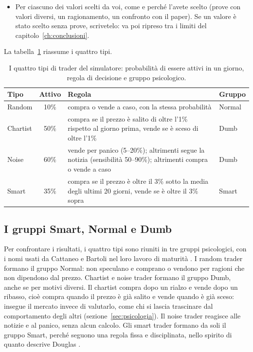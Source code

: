 \begin{aggiunte}
\begin{itemize}
  \item Per ciascuno dei valori scelti da voi, come e perché l'avete scelto
        (prove con valori diversi, un ragionamento, un confronto con il
        paper). Se un valore è stato scelto senza prove, scrivetelo: va poi
        ripreso tra i limiti del capitolo~\ref{ch:conclusioni}.
\end{itemize}
\end{aggiunte}

La tabella~\ref{tab:trader} riassume i quattro tipi.

\begin{table}[htbp]
\centering
\small
\begin{tabular}{@{}lcp{6.2cm}l@{}}
\toprule
Tipo & Attivo & Regola & Gruppo \\
\midrule
Random   & 10\% & compra o vende a caso, con la stessa probabilità & Normal \\
Chartist & 50\% & compra se il prezzo è salito di oltre l'1\% rispetto al giorno prima, vende se è sceso di oltre l'1\% & Dumb \\
Noise    & 60\% & vende per panico (5--20\%); altrimenti segue la notizia (sensibilità 50--90\%); altrimenti compra o vende a caso & Dumb \\
Smart    & 35\% & compra se il prezzo è oltre il 3\% sotto la media degli ultimi 20 giorni, vende se è oltre il 3\% sopra & Smart \\
\bottomrule
\end{tabular}
\caption{I quattro tipi di trader del simulatore: probabilità di essere attivi in un giorno, regola di decisione e gruppo psicologico.}
\label{tab:trader}
\end{table}

\subsection{I gruppi Smart, Normal e Dumb}

Per confrontare i risultati, i quattro tipi sono riuniti in tre gruppi psicologici, con i nomi usati da Cattaneo e Bartoli nel loro lavoro di maturità \cite{cattaneo}. I random trader formano il gruppo Normal: non speculano e comprano o vendono per ragioni che non dipendono dal prezzo. Chartist e noise trader formano il gruppo Dumb, anche se per motivi diversi. Il chartist compra dopo un rialzo e vende dopo un ribasso, cioè compra quando il prezzo è già salito e vende quando è già sceso: insegue il mercato invece di valutarlo, come chi si lascia trascinare dal comportamento degli altri (sezione~\ref{sec:psicologia}). Il noise trader reagisce alle notizie e al panico, senza alcun calcolo. Gli smart trader formano da soli il gruppo Smart, perché seguono una regola fissa e disciplinata, nello spirito di quanto descrive Douglas \cite{douglas}.

